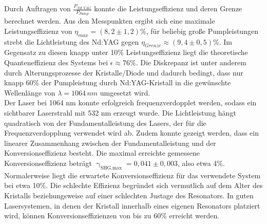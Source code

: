 \documentclass[twoside,colorback,accentcolor=tud4c,11pt]{tudreport}
\begin{document}
Durch Auftragen von $\frac{P_{Nd:YAG}}{P_{Pump}}$ konnte die Leistungseffizienz und deren Grenze berechnet werden. Aus den Messpunkten ergibt sich eine maximale Leistungseffizienz von $\eta_{max}=(8,2\pm 1,2)\%$, für beliebig große Pumpleistungen strebt die Lichtleistung des Nd:YAG gegen $\eta_{Grenze}\approx (9,4\pm 0,5)\%$. Im Gegensatz zu diesen knapp unter 10\% Leistungseffizienz liegt die theoretische Quanteneffizienz des Systems bei $\epsilon\approx 76\%$. Die Diskrepanz ist unter anderem durch Alterungsprozesse der Kristalle/Diode und dadurch bedingt, dass nur knapp 60\% der Pumpleistung durch Nd:YAG-Kristall in die gewünschte Wellenlänge von $\lambda=1064\,\si{nm}$ umgesetzt wird.\\
Der Laser bei 1064 nm konnte erfolgreich frequenzverdopplet werden, sodass ein sichtbarer Laserstrahl mit 532 nm erzeugt wurde. Die Lichtleistung hängt quadratisch von der Fundamentalleistung des Lasers, der für die Frequenzverdopplung verwendet wird ab. Zudem konnte gezeigt werden, dass ein linearer Zusammenhang zwischen der Fundamentalleistung und der Konversionseffizienz besteht. Die maximal erreichte gemessene Konversionseffizienz beträgt $\upgamma_{\text{SHG,max}}=0,041\pm0,003$, also etwa 4\%. Normalerweise liegt die erwartete Konversionseffizienz für das verwendete System bei etwa 10\%. Die schlechte Effizienz begründet sich vermutlich auf dem Alter des Kristalls beziehungsweise auf einer schlechten Justage des Resonators. In guten Lasersystemen, in denen der Kristall innerhalb eines eigenen Resonators platziert wird, können Konversionseffizienzen von bis zu 60\% erreicht werden.
\end{document}
